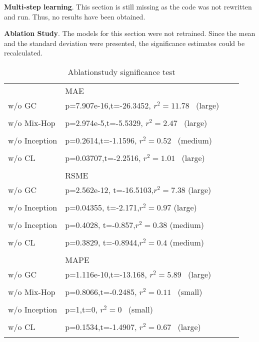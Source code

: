\documentclass[letterpaper, twocolumn,11pt]{article}
\begin{document}
    \textbf{Multi-step learning}. This section is still missing as the code was not rewritten and run. Thus, no results have been obtained.

    \textbf{Ablation Study}. The models for this section were not retrained. Since the mean and the standard deviation were presented, the significance estimates could be recalculated.
\begin{table}
       \scriptsize
\centering
\caption{Ablationstudy significance test}
\begin{tabular}{llll}
              & MAE                                                   \\
w/o GC        & p=7.907e-16,t=-26.3452, $r^2=11.78$~ (large)  \\
\hhline{--}\\
w/o Mix-Hop   & p=2.974e-5,t=-5.5329, $r^2=2.47$~ (large)     \\
\hhline{--}\\
w/o Inception & p=0.2614,t=-1.1596, $r^2=0.52$~ (medium)      \\
\hhline{--}\\
w/o CL        & p=0.03707,t=-2.2516, $r^2=1.01$~ (large)      \\
\hhline{==}\\
              & RSME                                                                                          \\
w/o GC & p=2.562e-12, t=-16.5103,$r^2=7.38$ (large)      \\
\hhline{--}\\
w/o Inception & p=0.04355, t=-2.171,$r^2=0.97$ (large)                                           \\
\hhline{--}\\
w/o Inception & p=0.4028, t=-0.857,$r^2=0.38$ (medium)                                           \\
\hhline{--} \\
w/o CL        & p=0.3829, t=-0.8944,$r^2=0.4$ (medium)                                             \\
\hhline{==}\\
              & MAPE                                              \\
w/o GC        & p=1.116e-10,t=-13.168, $r^2=5.89$~ (large)\\
\hhline{--}\\
w/o Mix-Hop   & p=0.8066,t=-0.2485, $r^2=0.11$~ (small)   \\
\hhline{--}\\
w/o Inception & p=1,t=0, $r^2=0$~ (small)               \\
\hhline{--}\\
w/o CL        & p=0.1534,t=-1.4907, $r^2=0.67$~ (large)   \\
\hhline{==}
\end{tabular}
\end{table}
\end{document}
